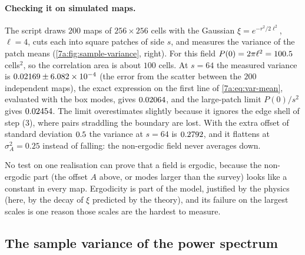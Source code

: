 \paragraph{Checking it on simulated maps.}
The script  draws $200$ maps of
$256\times256$ cells with the Gaussian $\xi=e^{-r^2/2\ell^2}$, $\ell=4$, cuts each
into square patches of side $s$, and measures the variance of the patch means
(\cref{7a:fig:sample-variance}, right). For this field
$P(0)=2\pi\ell^2=100.5$ cells$^2$, so the correlation area is about $100$ cells.
At $s=64$ the measured variance is $0.02169\pm6.082\times10^{-4}$ (the
error from the scatter between the $200$ independent maps), the exact expression on the
first line of \eqref{7a:eq:var-mean}, evaluated with the box modes, gives
$0.02064$, and the large-patch limit $P(0)/s^2$ gives
$0.02454$. The limit overestimates slightly because it ignores the edge
shell of step (3), where pairs straddling the boundary are lost. With the extra
offset of standard deviation $0.5$ the variance at $s=64$ is
$0.2792$, and it flattens at $\sigma_A^2=0.25$ instead of falling: the
non-ergodic field never averages down.

\begin{pitfall}
No test on one realisation can prove that a field is ergodic, because the
non-ergodic part (the offset $A$ above, or modes larger than the survey) looks
like a constant in every map. Ergodicity is part of the model, justified by the
physics (here, by the decay of $\xi$ predicted by the theory), and its failure on
the largest scales is one reason those scales are the hardest to measure.
\end{pitfall}

\subsection{The sample variance of the power spectrum}
\label{7a:sec:sample-var}

